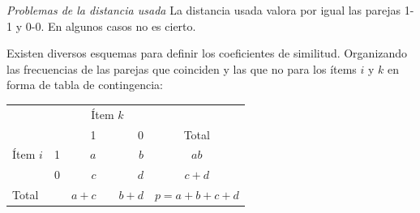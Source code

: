 \documentclass[spanish]{beamer}
\begin{document}
\begin{frame}{\textit{Problemas de la distancia usada}}
La distancia usada valora por igual las parejas 1-1 y 0-0. En algunos casos no es cierto.\break 

Existen diversos esquemas para definir los coeficientes de similitud. Organizando las frecuencias de las parejas que coinciden y las que no para los ítems $i$ y $k$ en forma de tabla de contingencia:

\begin{table}[H]
  \centering
\resizebox{7cm}{!} {
  \begin{tabular}{llrrrrr}
\multicolumn{2}{l}{\multirow{}{}{}} & \multicolumn{3}{c}{Ítem $k$} & \multicolumn{2}{c}{} \\\cmidrule{3-5}
\multicolumn{2}{l}{}                  & 1        &       & 0       & \multicolumn{2}{c}{{Total}}                        \\
\midrule
{Ítem $i$}       & 1      & $a$        &       & $b$       & \multicolumn{2}{c}{$ab$}                     \\
                              & 0      & $c$        &       & $d$       & \multicolumn{2}{c}{$c+d$}                     \\ \midrule
\multicolumn{2}{l}{Total}            & $a+c$      &       & $b+d$     & \multicolumn{2}{c}{$p=a+b+c+d$}\\
\bottomrule
\end{tabular}
}
\end{table}

\end{frame}
\end{document}
